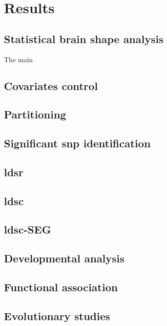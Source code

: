 \chapter{Results}\label{chap:results}
\section{Statistical brain shape analysis}
The main 
\section{Covariates control}
\section{Partitioning}
\section{Significant \ac{snp} identification}
\section{\ac{ldsr}}
\section{\ac{ldsc}}
\section{\ac{ldsc}-SEG}
\section{Developmental analysis}
\section{Functional association}
\section{Evolutionary studies}
